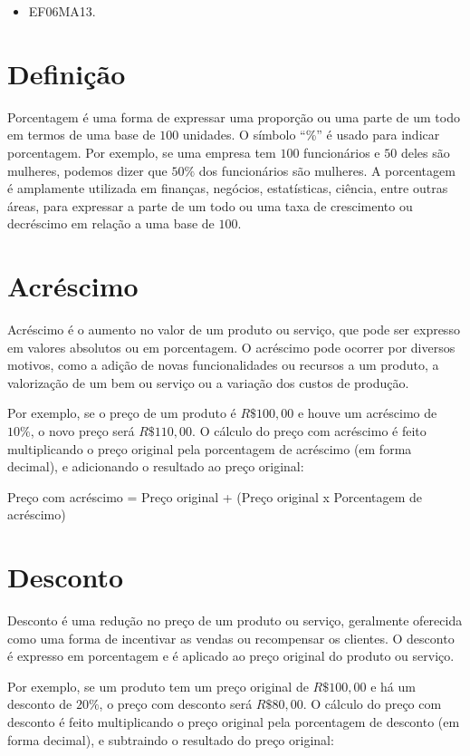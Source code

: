 
\begin{itemize}
\item EF06MA13.
\end{itemize}

\section{Definição}

Porcentagem é uma forma de expressar uma proporção ou uma parte de um
todo em termos de uma base de $100$ unidades. O símbolo ``\%'' é usado
para indicar porcentagem. Por exemplo, se uma empresa tem $100$
funcionários e $50$ deles são mulheres, podemos dizer que $50\%$ dos
funcionários são mulheres. A porcentagem é amplamente utilizada em
finanças, negócios, estatísticas, ciência, entre outras áreas, para
expressar a parte de um todo ou uma taxa de crescimento ou decréscimo em
relação a uma base de $100$.

\section{Acréscimo}

Acréscimo é o aumento no valor de um produto ou serviço, que pode ser
expresso em valores absolutos ou em porcentagem. O acréscimo pode
ocorrer por diversos motivos, como a adição de novas funcionalidades ou
recursos a um produto, a valorização de um bem ou serviço ou a variação
dos custos de produção.

Por exemplo, se o preço de um produto é $R\$100,00$ e houve um acréscimo
de $10\%$, o novo preço será $R\$110,00$. O cálculo do preço com acréscimo é
feito multiplicando o preço original pela porcentagem de acréscimo (em
forma decimal), e adicionando o resultado ao preço original:

Preço com acréscimo = Preço original + (Preço original x Porcentagem de
acréscimo)

\section{Desconto}

Desconto é uma redução no preço de um produto ou serviço, geralmente
oferecida como uma forma de incentivar as vendas ou recompensar os
clientes. O desconto é expresso em porcentagem e é aplicado ao preço
original do produto ou serviço.

Por exemplo, se um produto tem um preço original de $R\$100,00$ e há um
desconto de $20\%$, o preço com desconto será $R\$80,00$. O cálculo do preço
com desconto é feito multiplicando o preço original pela porcentagem de
desconto (em forma decimal), e subtraindo o resultado do preço original:

